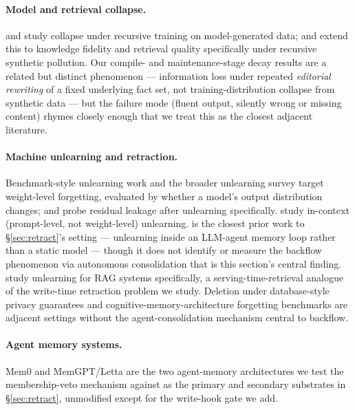 \paragraph{Model and retrieval collapse.} \citet{shumailov2024collapse} and \citet{gerstgrasser2024collapse} study collapse under recursive training on model-generated data; \citet{modelcollapse2025} and \citet{retrievalcollapse} extend this to knowledge fidelity and retrieval quality specifically under recursive synthetic pollution. Our compile- and maintenance-stage decay results are a related but distinct phenomenon --- information loss under repeated \emph{editorial rewriting} of a fixed underlying fact set, not training-distribution collapse from synthetic data --- but the failure mode (fluent output, silently wrong or missing content) rhymes closely enough that we treat this as the closest adjacent literature.

\paragraph{Machine unlearning and retraction.} Benchmark-style unlearning work \citep{maini2024tofu,shi2024muse,jin2024rwku,chen2024flat} and the broader unlearning survey \citep{bourtoule2021machine} target weight-level forgetting, evaluated by whether a model's output distribution changes; \citet{eldan2023whosharrypotter} and \citet{ye2024harrypotterleak} probe residual leakage after unlearning specifically. \citet{pawelczyk2024incontext} study in-context (prompt-level, not weight-level) unlearning. \citet{agenticunlearning2026} is the closest prior work to \S\ref{sec:retract}'s setting --- unlearning inside an LLM-agent memory loop rather than a static model --- though it does not identify or measure the backflow phenomenon via autonomous consolidation that is this section's central finding. \citet{liu2024unlearnrag} study unlearning for RAG systems specifically, a serving-time-retrieval analogue of the write-time retraction problem we study. Deletion under database-style privacy guarantees \citep{inference2026deletion} and cognitive-memory-architecture forgetting benchmarks \citep{forgetful2026} are adjacent settings without the agent-consolidation mechanism central to backflow.

\paragraph{Agent memory systems.} Mem0 \citep{chhikara2025mem0} and MemGPT/Letta \citep{packer2023memgpt} are the two agent-memory architectures we test the membership-veto mechanism against as the primary and secondary substrates in \S\ref{sec:retract}, unmodified except for the write-hook gate we add.
